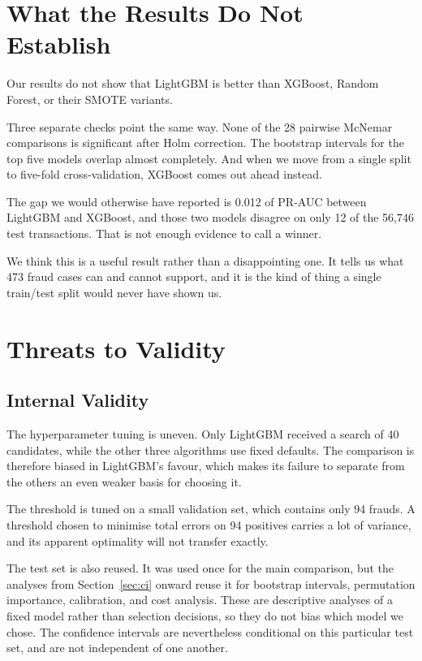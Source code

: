 \section{What the Results Do Not Establish}
\label{sec:notestablish}

Our results do not show that LightGBM is better than XGBoost, Random Forest, or their SMOTE
variants.

Three separate checks point the same way. None of the 28 pairwise McNemar comparisons is
significant after Holm correction. The bootstrap intervals for the top five models overlap
almost completely. And when we move from a single split to five-fold cross-validation,
XGBoost comes out ahead instead.

The gap we would otherwise have reported is 0.012 of PR-AUC between LightGBM and XGBoost,
and those two models disagree on only 12 of the 56{,}746 test transactions. That is not
enough evidence to call a winner.

We think this is a useful result rather than a disappointing one. It tells us what 473 fraud
cases can and cannot support, and it is the kind of thing a single train/test split would
never have shown us.

\section{Threats to Validity}

\subsection{Internal Validity}

The hyperparameter tuning is uneven. Only LightGBM received a search of 40
candidates, while the other three algorithms use fixed defaults. The comparison is therefore
biased in LightGBM's favour, which makes its failure to separate from the others an even
weaker basis for choosing it.

The threshold is tuned on a small validation set, which contains only 94 frauds.
A threshold chosen to minimise total errors on 94 positives carries a lot of variance, and
its apparent optimality will not transfer exactly.

The test set is also reused. It was used once for the main comparison,
but the analyses from Section~\ref{sec:ci} onward reuse it for bootstrap intervals,
permutation importance, calibration, and cost analysis. These are descriptive analyses of a
fixed model rather than selection decisions, so they do not bias which model we chose. The
confidence intervals are nevertheless conditional on this particular test set, and are not
independent of one another.

